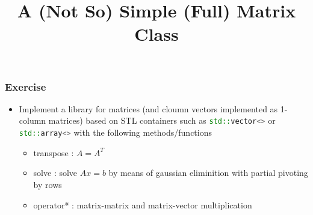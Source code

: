 \documentclass[smaller,a4paper,allowframebreaks]{beamer}
\begin{document}
\title{A (Not So) Simple (Full) Matrix Class}
\frame{\titlepage}

\begin{frame}
\frametitle{Exercise}

\begin{itemize}
\item Implement a
      library for matrices (and cloumn vectors 
      implemented as 1-column matrices) based on 
      STL containers such as \lstinline[language=C++]{std::vector<>}
      or \lstinline[language=C++]{std::array<>}
      with the following methods/functions
      \begin{itemize}
      \item transpose : $A = A^{T}$
      \item solve : solve $A x = b$ by means of gaussian eliminition with partial pivoting by rows
      \item operator* : matrix-matrix and matrix-vector multiplication
      \end{itemize}      
\end{itemize}
\end{frame}
\end{document}
